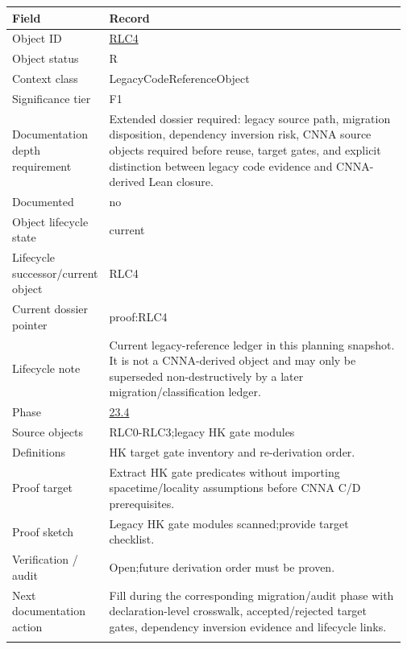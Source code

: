 \begin{longtable}{L{0.16\linewidth} L{0.81\linewidth}}
\hline
\textbf{Field} & \textbf{Record}\\
\hline
Object ID & \hyperlink{object-row-RLC4}{RLC4}\\
\hline\addlinespace[0.20em]
Object status & R\\
\hline\addlinespace[0.20em]
Context class & LegacyCodeReferenceObject\\
\hline\addlinespace[0.20em]
Significance tier & F1\\
\hline\addlinespace[0.20em]
Documentation depth requirement & Extended dossier required: legacy source path, migration disposition, dependency inversion risk, CNNA source objects required before reuse, target gates, and explicit distinction between legacy code evidence and CNNA-derived Lean closure.\\
\hline\addlinespace[0.20em]
Documented & no\\
\hline\addlinespace[0.20em]
Object lifecycle state & current\\
\hline\addlinespace[0.20em]
Lifecycle successor/\allowbreak{}current object & RLC4\\
\hline\addlinespace[0.20em]
Current dossier pointer & proof:RLC4\\
\hline\addlinespace[0.20em]
Lifecycle note & Current legacy-reference ledger in this planning snapshot. It is not a CNNA-derived object and may only be superseded non-destructively by a later migration/\allowbreak{}classification ledger.\\
\hline\addlinespace[0.20em]
Phase & \hyperlink{phase-row-23-4}{23.4}\\
\hline\addlinespace[0.20em]
Source objects & RLC0-RLC3;\newline legacy HK gate modules\\
\hline\addlinespace[0.20em]
Definitions & HK target gate inventory and re-derivation order.\\
\hline\addlinespace[0.20em]
Proof target & Extract HK gate predicates without importing spacetime/\allowbreak{}locality assumptions before CNNA C/\allowbreak{}D prerequisites.\\
\hline\addlinespace[0.20em]
Proof sketch & Legacy HK gate modules scanned;\newline provide target checklist.\\
\hline\addlinespace[0.20em]
Verification /\allowbreak{} audit & Open;\newline future derivation order must be proven.\\
\hline\addlinespace[0.20em]
Next documentation action & Fill during the corresponding migration/\allowbreak{}audit phase with declaration-level crosswalk, accepted/\allowbreak{}rejected target gates, dependency inversion evidence and lifecycle links.\\
\hline\addlinespace[0.20em]
\end{longtable}
